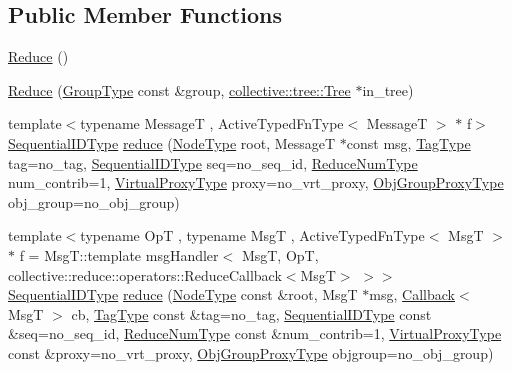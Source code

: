\subsection*{Public Member Functions}
\begin{DoxyCompactItemize}
\item 
\hyperlink{structvt_1_1collective_1_1reduce_1_1_reduce_a1a3dc3704014f244b5344e320fee0c2e}{Reduce} ()
\item 
\hyperlink{structvt_1_1collective_1_1reduce_1_1_reduce_a223205c0c65b754e47731520ab3c79b6}{Reduce} (\hyperlink{namespacevt_a27b5e4411c9b6140c49100e050e2f743}{Group\+Type} const \&group, \hyperlink{structvt_1_1collective_1_1tree_1_1_tree}{collective\+::tree\+::\+Tree} $\ast$in\+\_\+tree)
\item 
{\footnotesize template$<$typename MessageT , Active\+Typed\+Fn\+Type$<$ Message\+T $>$ $\ast$ f$>$ }\\\hyperlink{namespacevt_a3063d4db3b879d6dd2c7b8d50995c7f6}{Sequential\+I\+D\+Type} \hyperlink{structvt_1_1collective_1_1reduce_1_1_reduce_a70c21400562e2a43e6d0cfa4a08602f7}{reduce} (\hyperlink{namespacevt_a866da9d0efc19c0a1ce79e9e492f47e2}{Node\+Type} root, MessageT $\ast$const msg, \hyperlink{namespacevt_a84ab281dae04a52a4b243d6bf62d0e52}{Tag\+Type} tag=no\+\_\+tag, \hyperlink{namespacevt_a3063d4db3b879d6dd2c7b8d50995c7f6}{Sequential\+I\+D\+Type} seq=no\+\_\+seq\+\_\+id, \hyperlink{structvt_1_1collective_1_1reduce_1_1_reduce_a6fd4d5e956ac5acd321e57c7dad5131f}{Reduce\+Num\+Type} num\+\_\+contrib=1, \hyperlink{namespacevt_a1b417dd5d684f045bb58a0ede70045ac}{Virtual\+Proxy\+Type} proxy=no\+\_\+vrt\+\_\+proxy, \hyperlink{namespacevt_ad7cae989df485fccca57f0792a880a8e}{Obj\+Group\+Proxy\+Type} obj\+\_\+group=no\+\_\+obj\+\_\+group)
\item 
{\footnotesize template$<$typename OpT , typename MsgT , Active\+Typed\+Fn\+Type$<$ Msg\+T $>$ $\ast$ f = Msg\+T\+::template msg\+Handler$<$      Msg\+T, Op\+T, collective\+::reduce\+::operators\+::\+Reduce\+Callback$<$\+Msg\+T$>$    $>$$>$ }\\\hyperlink{namespacevt_a3063d4db3b879d6dd2c7b8d50995c7f6}{Sequential\+I\+D\+Type} \hyperlink{structvt_1_1collective_1_1reduce_1_1_reduce_a484cfaf8063afa89db2116c1781f9384}{reduce} (\hyperlink{namespacevt_a866da9d0efc19c0a1ce79e9e492f47e2}{Node\+Type} const \&root, MsgT $\ast$msg, \hyperlink{namespacevt_a36db99df4c973d48b1118a293fff533f}{Callback}$<$ MsgT $>$ cb, \hyperlink{namespacevt_a84ab281dae04a52a4b243d6bf62d0e52}{Tag\+Type} const \&tag=no\+\_\+tag, \hyperlink{namespacevt_a3063d4db3b879d6dd2c7b8d50995c7f6}{Sequential\+I\+D\+Type} const \&seq=no\+\_\+seq\+\_\+id, \hyperlink{structvt_1_1collective_1_1reduce_1_1_reduce_a6fd4d5e956ac5acd321e57c7dad5131f}{Reduce\+Num\+Type} const \&num\+\_\+contrib=1, \hyperlink{namespacevt_a1b417dd5d684f045bb58a0ede70045ac}{Virtual\+Proxy\+Type} const \&proxy=no\+\_\+vrt\+\_\+proxy, \hyperlink{namespacevt_ad7cae989df485fccca57f0792a880a8e}{Obj\+Group\+Proxy\+Type} objgroup=no\+\_\+obj\+\_\+group)

\end{DoxyCompactItemize}
